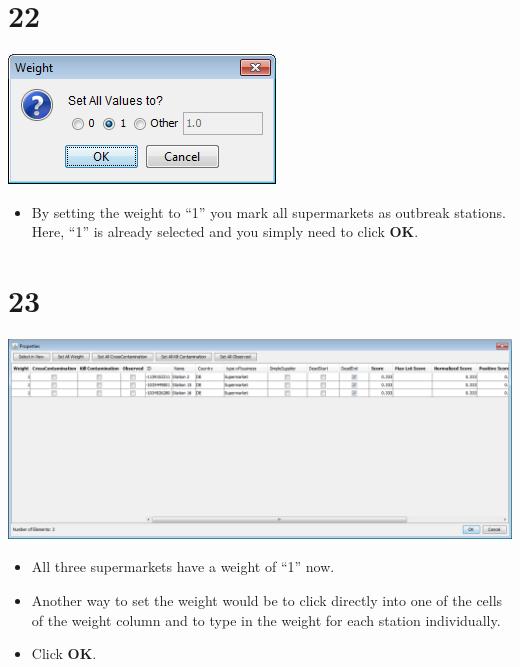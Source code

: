 \documentclass[10pt]{beamer}
\begin{document}
\section{22}
\begin{frame}
	\begin{center}
			\includegraphics[width=0.5\columnwidth]{22.png}
	\end{center}
	\begin{itemize}
		\item By setting the weight to ``1'' you mark all supermarkets as outbreak stations. Here, ``1'' is already selected and you simply need to click \textbf{OK}.
	\end{itemize}
\end{frame}

\section{23}
\begin{frame}
	\begin{center}
			\includegraphics[width=0.9\columnwidth]{23.png}
	\end{center}
	\begin{itemize}
		\item All three supermarkets have a weight of ``1'' now.
		\item Another way to set the weight would be to click directly into one of the cells of the weight column and to type in the weight for each station individually.
		\item Click \textbf{OK}.
	\end{itemize}
\end{frame}
\end{document}
